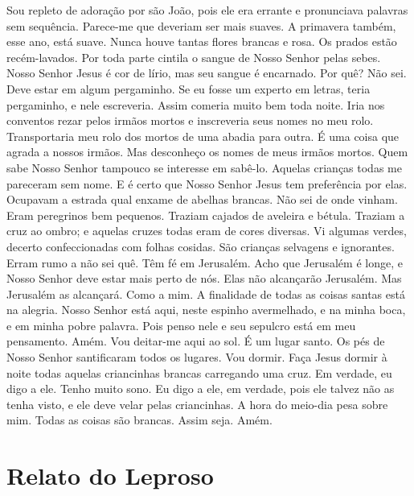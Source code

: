 Sou repleto de adoração por são João, pois ele era errante e pronunciava
palavras sem sequência. Parece-me que deveriam ser mais suaves. A
primavera também, esse ano, está suave. Nunca houve tantas flores brancas
e rosa. Os prados estão recém-lavados. Por toda parte cintila o sangue de
Nosso Senhor pelas sebes. Nosso Senhor Jesus é cor de lírio, mas seu
sangue é encarnado. Por quê? Não sei. Deve estar em algum pergaminho. Se
eu fosse um experto em letras, teria pergaminho, e nele escreveria. Assim
comeria muito bem toda noite. Iria nos conventos rezar pelos irmãos mortos
e inscreveria seus nomes no meu rolo. Transportaria meu rolo dos mortos de
uma abadia para outra. É uma coisa que agrada a nossos irmãos. Mas
desconheço os nomes de meus irmãos mortos. Quem sabe Nosso Senhor tampouco
se interesse em sabê-lo. Aquelas crianças todas me pareceram sem nome. E é
certo que Nosso Senhor Jesus tem preferência por elas. Ocupavam a estrada
qual enxame de abelhas brancas. Não sei de onde vinham. Eram peregrinos
bem pequenos. Traziam cajados de aveleira e bétula. Traziam a cruz ao
ombro; e aquelas cruzes todas eram de cores diversas. Vi algumas verdes,
decerto confeccionadas com folhas cosidas. São crianças selvagens e
ignorantes. Erram rumo a não sei quê. Têm fé em Jerusalém. Acho que
Jerusalém é longe, e Nosso Senhor deve estar mais perto de nós. Elas não
alcançarão Jerusalém. Mas Jerusalém as alcançará. Como a mim. A finalidade
de todas as coisas santas está na alegria. Nosso Senhor está aqui, neste
espinho avermelhado, e na minha boca, e em minha pobre palavra. Pois penso
nele e seu sepulcro está em meu pensamento. Amém. Vou deitar-me aqui ao
sol. É um lugar santo. Os pés de Nosso Senhor santificaram todos os
lugares. Vou dormir. Faça Jesus dormir à noite todas aquelas criancinhas
brancas carregando uma cruz. Em verdade, eu digo a ele. Tenho muito sono.
Eu digo a ele, em verdade, pois ele talvez não as tenha visto, e ele deve
velar pelas criancinhas. A hora do meio-dia pesa sobre mim. Todas as
coisas são brancas. Assim seja. Amém.

\chapter{Relato do Leproso}

